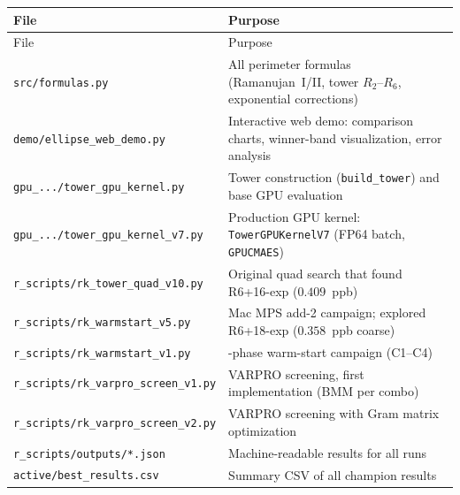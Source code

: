 \documentclass[12pt]{article}
\begin{document}
\newcommand{\fp}[1]{\texttt{#1}}%
\begin{center}\small
\begin{longtable}{@{}l >{\raggedright\arraybackslash}p{7.8cm}@{}}
\toprule
File & Purpose \\
\midrule
\endfirsthead
\toprule
File & Purpose \\
\midrule
\endhead
\fp{src/formulas.py}               & All perimeter formulas (Ramanujan~I/II, tower $R_2$--$R_6$, exponential corrections) \\[3pt]
\fp{demo/ellipse\_web\_demo.py}     & Interactive web demo: comparison charts, winner-band visualization, error analysis \\[3pt]
\fp{gpu\_.../tower\_gpu\_kernel.py}  & Tower construction (\fp{build\_tower}) and base GPU evaluation \\[3pt]
\fp{gpu\_.../tower\_gpu\_kernel\_v7.py} & Production GPU kernel: \fp{TowerGPUKernelV7} (FP64 batch, \fp{GPUCMAES}) \\[3pt]
\fp{r\_scripts/rk\_tower\_quad\_v10.py} & Original quad search that found R6+16-exp ($0.409$~ppb) \\[3pt]
\fp{r\_scripts/rk\_warmstart\_v5.py}    & Mac MPS add-2 campaign; explored R6+18-exp ($0.358$~ppb coarse) \\[3pt]
\fp{r\_scripts/rk\_warmstart\_v1.py}    & 4-phase warm-start campaign (C1--C4) \\[3pt]
\fp{r\_scripts/rk\_varpro\_screen\_v1.py} & VARPRO screening, first implementation (BMM per combo) \\[3pt]
\fp{r\_scripts/rk\_varpro\_screen\_v2.py} & VARPRO screening with Gram matrix optimization \\[3pt]
\fp{r\_scripts/outputs/*.json}          & Machine-readable results for all runs \\[3pt]
\fp{active/best\_results.csv}           & Summary CSV of all champion results \\
\bottomrule
\end{longtable}
\end{center}
\end{document}
